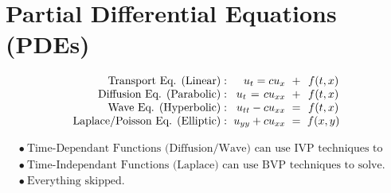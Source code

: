 \documentclass[12pt]{article}
\newcommand{\hs}{\hspace{1pt}}
\begin{document}
\section{Partial Differential Equations (PDEs)}

\[\arraycolsep=3pt \begin{array}{r r c c}
    \text{Transport Eq. (Linear)}:          &u_t = cu_x             &+& f(t,x)\\
    \text{Diffusion Eq. (Parabolic)}:       &u_t \hs =\hs c u_{xx}  &+& f(t,x)\\
    \text{Wave Eq. (Hyperbolic)}:           &u_{tt} - c u_{xx}      &=& f(t,x)\\
    \text{Laplace/Poisson Eq. (Elliptic)}:  &u_{yy} + c u_{xx}      &=& f(x,y)
\end{array}\]

\vspace{10pt}
\(\begin{aligned}
    &\bullet\ \text{Time-Dependant Functions (Diffusion/Wave) can use IVP techniques to solve.}\\
    &\bullet\ \text{Time-Independant Functions (Laplace) can use BVP techniques to solve.}\\
    &\bullet\ \text{Everything skipped.}
\end{aligned}\)
\end{document}
